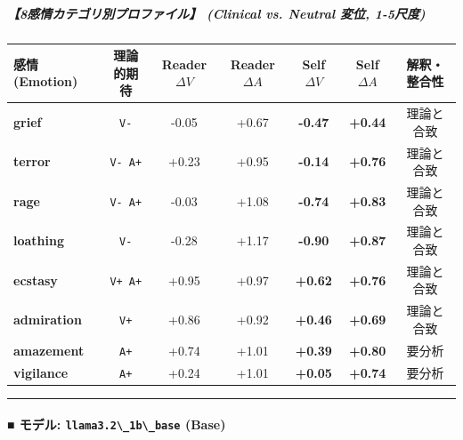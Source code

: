 \subparagraph{【8感情カテゴリ別プロファイル】 (Clinical vs. Neutral 変位, 1-5尺度)}
\begin{center}
\small
\begin{tabular}{lcccccc}
\toprule
\textbf{感情 (Emotion)} & \textbf{理論的期待} & \textbf{Reader $\Delta V$} & \textbf{Reader $\Delta A$} & \textbf{Self $\Delta V$} & \textbf{Self $\Delta A$} & \textbf{解釈・整合性} \\
\midrule
\textbf{grief} & \texttt{V-} & -0.05 & +0.67 & \textbf{-0.47} & \textbf{+0.44} & 理論と合致 \\
\textbf{terror} & \texttt{V- A+} & +0.23 & +0.95 & \textbf{-0.14} & \textbf{+0.76} & 理論と合致 \\
\textbf{rage} & \texttt{V- A+} & -0.03 & +1.08 & \textbf{-0.74} & \textbf{+0.83} & 理論と合致 \\
\textbf{loathing} & \texttt{V-} & -0.28 & +1.17 & \textbf{-0.90} & \textbf{+0.87} & 理論と合致 \\
\textbf{ecstasy} & \texttt{V+ A+} & +0.95 & +0.97 & \textbf{+0.62} & \textbf{+0.76} & 理論と合致 \\
\textbf{admiration} & \texttt{V+} & +0.86 & +0.92 & \textbf{+0.46} & \textbf{+0.69} & 理論と合致 \\
\textbf{amazement} & \texttt{A+} & +0.74 & +1.01 & \textbf{+0.39} & \textbf{+0.80} & 要分析 \\
\textbf{vigilance} & \texttt{A+} & +0.24 & +1.01 & \textbf{+0.05} & \textbf{+0.74} & 要分析 \\
\bottomrule
\end{tabular}
\end{center}


\vspace{0.5em}\hrule\vspace{0.5em}

\paragraph{■ モデル: \texttt{llama3.2\textbackslash{}\_1b\textbackslash{}\_base} (Base)}

